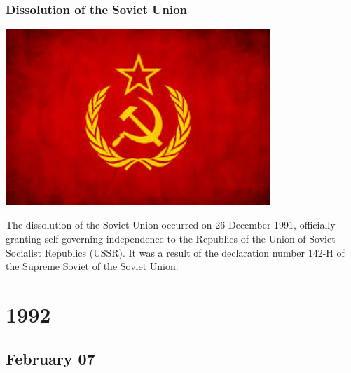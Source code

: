 \documentclass[11pt]{report}
\begin{document}
\subsection{Dissolution of the Soviet Union}
\vspace{2mm}\begin{center}\includegraphics[width=10cm]{./img/ussr.jpg}\end{center}
The dissolution of the Soviet Union occurred on 26 December 1991, officially granting self-governing independence to the Republics of the Union of Soviet Socialist Republics (USSR). It was a result of the declaration number 142-H of the Supreme Soviet of the Soviet Union.

\chapter{1992}
\section{February 07}
\end{document}
